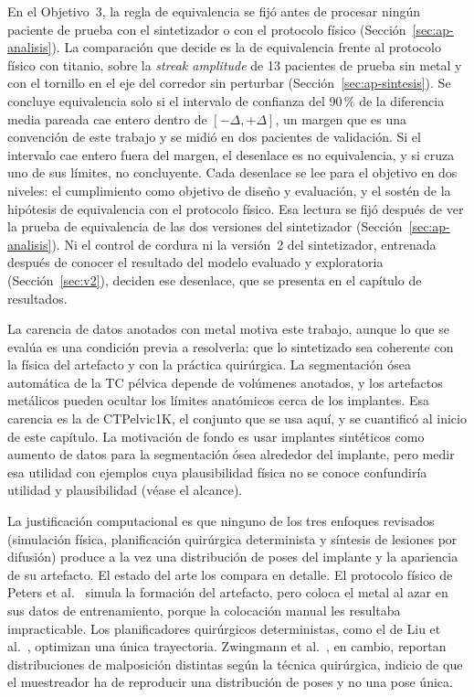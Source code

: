En el Objetivo~3, la regla de equivalencia se fijó antes de procesar ningún paciente de prueba con el sintetizador o con el protocolo físico (Sección~\ref{sec:ap-analisis}). La comparación que decide es la de equivalencia frente al protocolo físico con titanio, sobre la \emph{streak amplitude} de 13 pacientes de prueba sin metal y con el tornillo en el eje del corredor sin perturbar (Sección~\ref{sec:ap-sintesis}). Se concluye equivalencia solo si el intervalo de confianza del 90\,\% de la diferencia media pareada cae entero dentro de $[-\Delta, +\Delta]$, un margen que es una convención de este trabajo y se midió en dos pacientes de validación. Si el intervalo cae entero fuera del margen, el desenlace es no equivalencia, y si cruza uno de sus límites, no concluyente. Cada desenlace se lee para el objetivo en dos niveles: el cumplimiento como objetivo de diseño y evaluación, y el sostén de la hipótesis de equivalencia con el protocolo físico. Esa lectura se fijó después de ver la prueba de equivalencia de las dos versiones del sintetizador (Sección~\ref{sec:ap-analisis}). Ni el control de cordura ni la versión~2 del sintetizador, entrenada después de conocer el resultado del modelo evaluado y exploratoria (Sección~\ref{sec:v2}), deciden ese desenlace, que se presenta en el capítulo de resultados.


La carencia de datos anotados con metal motiva este trabajo, aunque lo que se evalúa es una condición previa a resolverla: que lo sintetizado sea coherente con la física del artefacto y con la práctica quirúrgica. La segmentación ósea automática de la TC pélvica depende de volúmenes anotados, y los artefactos metálicos pueden ocultar los límites anatómicos cerca de los implantes. Esa carencia es la de CTPelvic1K, el conjunto que se usa aquí, y se cuantificó al inicio de este capítulo. La motivación de fondo es usar implantes sintéticos como aumento de datos para la segmentación ósea alrededor del implante, pero medir esa utilidad con ejemplos cuya plausibilidad física no se conoce confundiría utilidad y plausibilidad (véase el alcance).

La justificación computacional es que ninguno de los tres enfoques revisados (simulación física, planificación quirúrgica determinista y síntesis de lesiones por difusión) produce a la vez una distribución de poses del implante y la apariencia de su artefacto. El estado del arte los compara en detalle. El protocolo físico de Peters et al.~\cite{peters2025hybrid} simula la formación del artefacto, pero coloca el metal al azar en sus datos de entrenamiento, porque la colocación manual les resultaba impracticable. Los planificadores quirúrgicos deterministas, como el de Liu et al.~\cite{liu2025pipeline}, optimizan una única trayectoria. Zwingmann et al.~\cite{zwingmann2009navigated}, en cambio, reportan distribuciones de malposición distintas según la técnica quirúrgica, indicio de que el muestreador ha de reproducir una distribución de poses y no una pose única.

